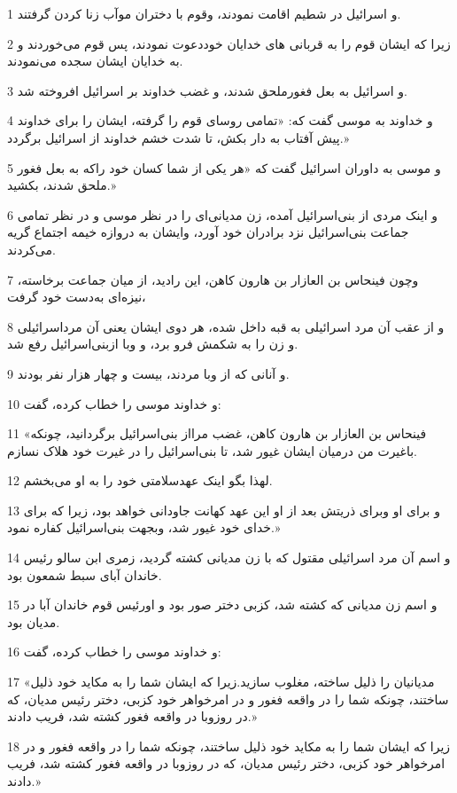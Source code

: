 \par 1 و اسرائیل در شطیم اقامت نمودند، وقوم با دختران موآب زنا کردن گرفتند.
\par 2 زیرا که ایشان قوم را به قربانی های خدایان خوددعوت نمودند، پس قوم می‌خوردند و به خدایان ایشان سجده می‌نمودند.
\par 3 و اسرائیل به بعل فغورملحق شدند، و غضب خداوند بر اسرائیل افروخته شد.
\par 4 و خداوند به موسی گفت که: «تمامی روسای قوم را گرفته، ایشان را برای خداوند پیش آفتاب به دار بکش، تا شدت خشم خداوند از اسرائیل برگردد.»
\par 5 و موسی به داوران اسرائیل گفت که «هر یکی از شما کسان خود راکه به بعل فغور ملحق شدند، بکشید.»
\par 6 و اینک مردی از بنی‌اسرائیل آمده، زن مدیانی‌ای را در نظر موسی و در نظر تمامی جماعت بنی‌اسرائیل نزد برادران خود آورد، وایشان به دروازه خیمه اجتماع گریه می‌کردند.
\par 7 وچون فینحاس بن العازار بن هارون کاهن، این رادید، از میان جماعت برخاسته، نیزه‌ای به‌دست خود گرفت،
\par 8 و از عقب آن مرد اسرائیلی به قبه داخل شده، هر دوی ایشان یعنی آن مرداسرائیلی و زن را به شکمش فرو برد، و وبا ازبنی‌اسرائیل رفع شد.
\par 9 و آنانی که از وبا مردند، بیست و چهار هزار نفر بودند.
\par 10 و خداوند موسی را خطاب کرده، گفت:
\par 11 «فینحاس بن العازار بن هارون کاهن، غضب مرااز بنی‌اسرائیل برگردانید، چونکه باغیرت من درمیان ایشان غیور شد، تا بنی‌اسرائیل را در غیرت خود هلاک نسازم.
\par 12 لهذا بگو اینک عهدسلامتی خود را به او می‌بخشم.
\par 13 و برای او وبرای ذریتش بعد از او این عهد کهانت جاودانی خواهد بود، زیرا که برای خدای خود غیور شد، وبجهت بنی‌اسرائیل کفاره نمود.»
\par 14 و اسم آن مرد اسرائیلی مقتول که با زن مدیانی کشته گردید، زمری ابن سالو رئیس خاندان آبای سبط شمعون بود.
\par 15 و اسم زن مدیانی که کشته شد، کزبی دختر صور بود و اورئیس قوم خاندان آبا در مدیان بود.
\par 16 و خداوند موسی را خطاب کرده، گفت:
\par 17 «مدیانیان را ذلیل ساخته، مغلوب سازید.زیرا که ایشان شما را به مکاید خود ذلیل ساختند، چونکه شما را در واقعه فغور و در امرخواهر خود کزبی، دختر رئیس مدیان، که در روزوبا در واقعه فغور کشته شد، فریب دادند.»
\par 18 زیرا که ایشان شما را به مکاید خود ذلیل ساختند، چونکه شما را در واقعه فغور و در امرخواهر خود کزبی، دختر رئیس مدیان، که در روزوبا در واقعه فغور کشته شد، فریب دادند.»
 
